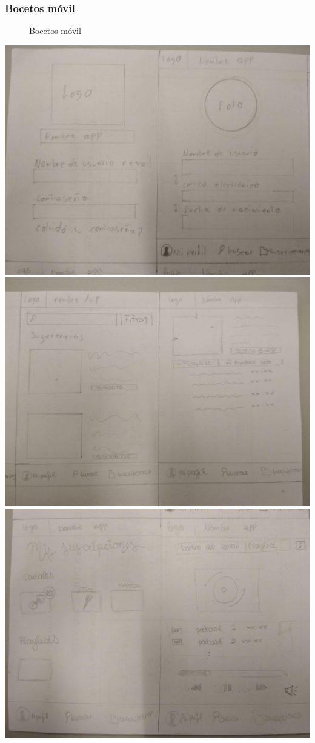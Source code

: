 \documentclass[a4paper]{article}
\begin{document}
\subsubsection{Bocetos móvil}
\begin{center}
\begin{figure}[H]
\centering
\caption{Bocetos móvil}
\label{fig:bm}
\end{figure}
\includegraphics[width=0.7\columnwidth]{Boceto-1.jpg} \\
\includegraphics[width=0.7\columnwidth]{Boceto-2.jpg} \\
\includegraphics[width=0.7\columnwidth]{Boceto-3.jpg}
\end{center}
\end{document}

